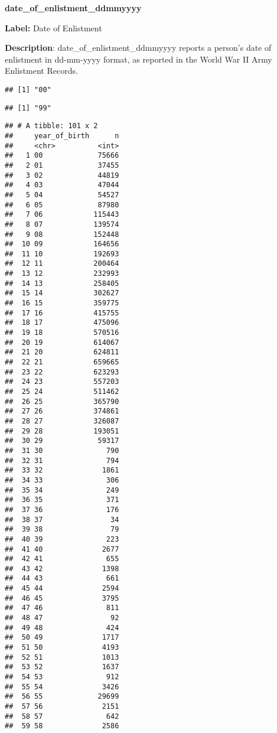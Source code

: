 \documentclass[
]{article}
\begin{document}
\newpage

\textbf{\huge date\_of\_enlistment\_ddmmyyyy } \normalsize \vspace{12pt}

\textbf{Label:} Date of Enlistment

\textbf{Description}: date\_of\_enlistment\_ddmmyyyy reports a person's
date of enlistment in dd-mm-yyyy format, as reported in the World War II
Army Enlistment Records.

\begin{verbatim}
## [1] "00"
\end{verbatim}

\begin{verbatim}
## [1] "99"
\end{verbatim}

\begin{verbatim}
## # A tibble: 101 x 2
##     year_of_birth      n
##     <chr>          <int>
##   1 00             75666
##   2 01             37455
##   3 02             44819
##   4 03             47044
##   5 04             54527
##   6 05             87980
##   7 06            115443
##   8 07            139574
##   9 08            152448
##  10 09            164656
##  11 10            192693
##  12 11            200464
##  13 12            232993
##  14 13            258405
##  15 14            302627
##  16 15            359775
##  17 16            415755
##  18 17            475096
##  19 18            570516
##  20 19            614067
##  21 20            624811
##  22 21            659665
##  23 22            623293
##  24 23            557203
##  25 24            511462
##  26 25            365790
##  27 26            374861
##  28 27            326087
##  29 28            193051
##  30 29             59317
##  31 30               790
##  32 31               794
##  33 32              1861
##  34 33               306
##  35 34               249
##  36 35               371
##  37 36               176
##  38 37                34
##  39 38                79
##  40 39               223
##  41 40              2677
##  42 41               655
##  43 42              1398
##  44 43               661
##  45 44              2594
##  46 45              3795
##  47 46               811
##  48 47                92
##  49 48               424
##  50 49              1717
##  51 50              4193
##  52 51              1013
##  53 52              1637
##  54 53               912
##  55 54              3426
##  56 55             29699
##  57 56              2151
##  58 57               642
##  59 58              2586

\end{verbatim}
\end{document}
